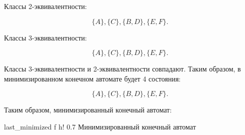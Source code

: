 Классы 2-эквивалентности:

\begin{equation*}
\{A\}, \{C\}, \{B, D\}, \{E, F\}.
\end{equation*}

Классы 3-эквивалентности:

\begin{equation*}
\{A\}, \{C\}, \{B, D\}, \{E, F\}.
\end{equation*}

Классы 3-эквивалентности и 2-эквивалентности совпадают. Таким образом, в минимизированном конечном автомате будет 4 состояния:

\begin{equation*}
\{A\}, \{C\}, \{B, D\}, \{E, F\}.
\end{equation*}

Таким образом, минимизированный конечный автомат:

    {last_minimized}
    {f}
    {h!}
    {0.7\textwidth}
    {Минимизированный конечный автомат}